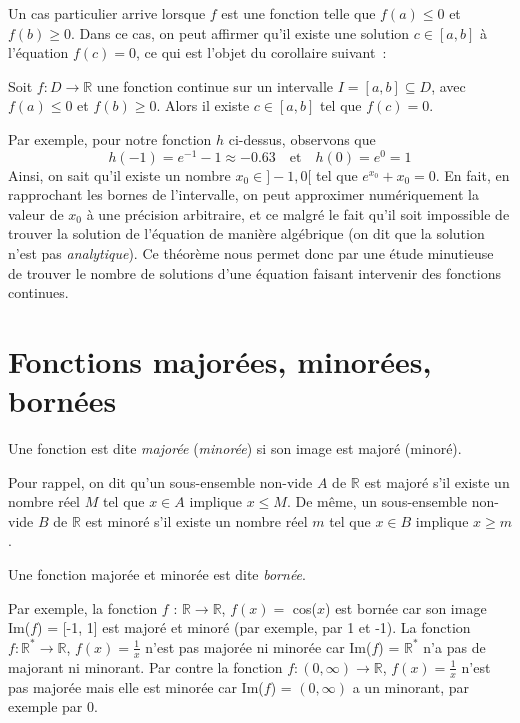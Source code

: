 Un cas particulier arrive lorsque $f$ est une fonction telle que $f(a) \leq 0$ et $f(b) \geq 0$. Dans ce cas, on peut affirmer qu'il existe une solution $c \in [a, b]$ à l'équation $f(c) = 0$, ce qui est l'objet du corollaire suivant~:
\begin{boxcorollary}
Soit $f : D \to \mathbb{R}$ une fonction continue sur un intervalle $I = [a, b] \subseteq D$, avec $f(a) \leq 0$ et $f(b) \geq 0$. Alors il existe $c \in [a, b]$ tel que
$f(c) = 0$.
\end{boxcorollary}
Par exemple, pour notre fonction $h$ ci-dessus, observons que
\begin{equation}
h(-1) = e^{-1} - 1 \approx -0.63 \quad \textrm{et} \quad h(0) = e^0 = 1
\end{equation}
Ainsi, on sait qu'il existe un nombre $x_0 \in ]-1, 0[$ tel que $e^{x_0} + x_0 = 0$. En fait, en rapprochant les bornes de l'intervalle, on peut approximer numériquement la valeur de $x_0$ à une précision arbitraire, et ce malgré le fait qu'il soit impossible de trouver la solution de l'équation de manière algébrique (on dit que la solution n'est pas \emph{analytique}). Ce théorème nous permet donc par une étude minutieuse de trouver le nombre de solutions d'une équation faisant intervenir des fonctions continues.

\section{Fonctions majorées, minorées, bornées}
\begin{boxdef} Une fonction est dite \textit{majorée} (\textit{minorée}) si son image est majoré (minoré).
\end{boxdef}

Pour rappel, on dit qu'un sous-ensemble non-vide $A$ de $\mathbb{R}$ est majoré s'il existe un nombre réel $M$ tel que $x \in A$ implique $x \leq M$. De même, un sous-ensemble non-vide $B$ de $\mathbb{R}$ est minoré s'il existe un nombre réel $m$ tel que $x \in B$ implique $x \geq m$. 

\begin{boxdef}
Une fonction majorée et minorée est dite \textit{bornée}.
\end{boxdef}

Par exemple, la fonction $f$ : $\mathbb{R} \to \mathbb{R}$, $f(x) = $ cos($x$) est bornée car son image Im($f$) = [-1, 1] est majoré et minoré (par exemple, par 1 et -1). La fonction $f : \mathbb{R^*} \to \mathbb{R}$, $f(x) = \frac{1}{x}$ n'est pas majorée ni minorée car Im($f$) = $\mathbb{R^*}$ n'a pas de majorant ni minorant. Par contre la fonction $f : (0, \infty) \to \mathbb{R}$,  $f(x) = \frac{1}{x}$ n'est pas majorée mais elle est minorée car Im($f$) = $(0, \infty)$ a un minorant, par exemple par 0.


